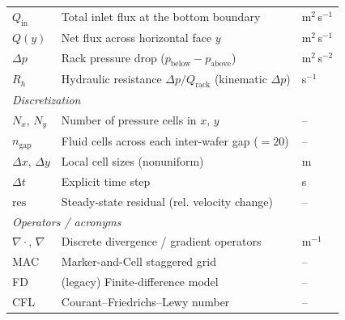 \documentclass[11pt]{article}
\begin{document}
\begin{longtable}{p{} p{} p{}}
$Q_\mathrm{in}$& Total inlet flux at the bottom boundary                 & m$^2$\,s$^{-1}$ \\
$Q(y)$         & Net flux across horizontal face $y$                     & m$^2$\,s$^{-1}$ \\
$\Delta p$     & Rack pressure drop ($p_{\mathrm{below}}-p_{\mathrm{above}}$) & m$^2$\,s$^{-2}$ \\
$R_h$          & Hydraulic resistance $\Delta p / Q_\mathrm{rack}$ (kinematic $\Delta p$) & s$^{-1}$ \\[4pt]
\multicolumn{3}{l}{\emph{Discretization}}\\
$N_x,\,N_y$    & Number of pressure cells in $x,\,y$                     & -- \\
$n_\mathrm{gap}$& Fluid cells across each inter-wafer gap ($=20$)        & -- \\
$\Delta x,\,\Delta y$ & Local cell sizes (nonuniform)                    & m \\
$\Delta t$     & Explicit time step                                      & s \\
$\mathrm{res}$ & Steady-state residual (rel. velocity change)            & -- \\[4pt]
\multicolumn{3}{l}{\emph{Operators / acronyms}}\\
$\nabla\!\cdot$, $\nabla$ & Discrete divergence / gradient operators    & m$^{-1}$ \\
MAC            & Marker-and-Cell staggered grid                          & -- \\
FD             & (legacy) Finite-difference model                        & -- \\
CFL            & Courant--Friedrichs--Lewy number                        & -- \\
\bottomrule
\end{longtable}

\clearpage

\end{document}
